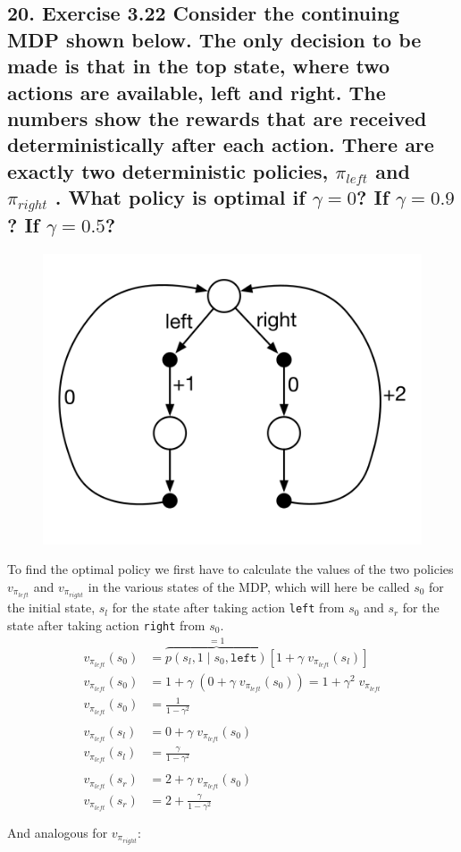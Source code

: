 \subsection*{20. Exercise 3.22 Consider the continuing MDP shown below. The only decision to be made is that in the top state, where two actions are available, left and right. The numbers show the rewards that are received deterministically after each action. There are exactly two deterministic policies, $\pi_{left}$ and $\pi_{right}$ . What policy is optimal if $\gamma = 0$? If $\gamma = 0.9$? If $\gamma = 0.5$?}
\begin{figure}[h]
\centering
\includegraphics[width=0.4\linewidth]{./ex20.png}
\end{figure}
To find the optimal policy we first have to calculate the values of the two policies $v_{\pi_{left}}$ and $v_{\pi_{right}}$ in the various states of the MDP, which will here be called $s_0$ for the initial state, $s_l$ for the state after taking action \texttt{left} from $s_0$ and $s_r$ for the state after taking action \texttt{right} from $s_0$.
\begin{align*}
v_{\pi_{left}}(s_0) &=  \overbrace{p(s_l, 1 \mid s_0, \texttt{left} )}^{=1} [1 + \gamma\; v_{\pi_{left}}(s_l)] \\
v_{\pi_{left}}(s_0) &= 1 + \gamma\; (0 + \gamma\; v_{\pi_{left}}(s_0)) = 1 + \gamma^2 \; v_{\pi_{left}} \\
v_{\pi_{left}}(s_0) &= \frac{1}{1 - \gamma^2} \\ \\
v_{\pi_{left}}(s_l) &=  0 + \gamma\; v_{\pi_{left}}(s_0) \\
v_{\pi_{left}}(s_l) &=  \frac{\gamma}{1 - \gamma^2} \\ \\
v_{\pi_{left}}(s_r) &=  2 + \gamma\; v_{\pi_{left}}(s_0) \\
v_{\pi_{left}}(s_r) &= 2+ \frac{\gamma}{1 - \gamma^2} \\ \\
\end{align*}
And analogous for $v_{\pi_{right}}$:
